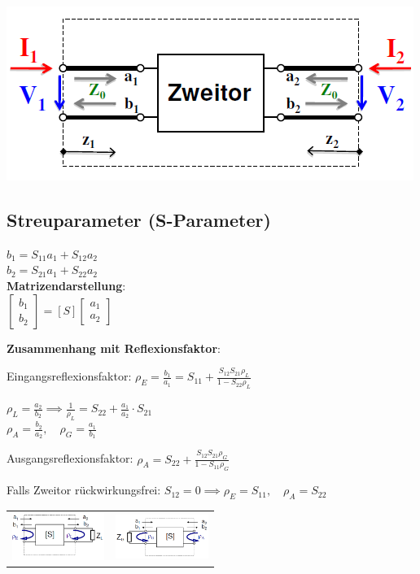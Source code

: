 \documentclass[english]{latex4ei/latex4ei_sheet}
\begin{document}
\begin{sectionbox}
\includegraphics[width = \columnwidth]{./img/zweitor_amplituden.png}
\end{sectionbox}
\begin{sectionbox}
	\subsection{Streuparameter (S-Parameter)}
	$b_1 = S_{11} a_1 + S_{12} a_2$\\
	$b_2 = S_{21} a_1 + S_{22} a_2$\\
	\textbf{Matrizendarstellung}:\\
	$\begin{bmatrix}
		b_1 \\
		b_2
	\end{bmatrix}
	= [S] \begin{bmatrix}
		a_1\\
		a_2
	\end{bmatrix}$

	\textbf{Zusammenhang mit Reflexionsfaktor}:\\
	\begin{emphbox}
	Eingangsreflexionsfaktor: $\rho_E = \frac{b_1}{a_1} = S_{11} + \frac{S_{12}S_{21}\rho_L}{1-S_{22}\rho_L}$
	\end{emphbox}

	$\rho_L = \frac{a_2}{b_2}  \implies \frac{1}{\rho_L} = S_{22} + \frac{a_1}{a_2}\cdot S_{21}$\\
	
	$\rho_A = \frac{b_2}{a_2}, \quad \rho_G = \frac{a_1}{b_1}$\\
	\begin{emphbox}
		Ausgangsreflexionsfaktor: $\rho_A = S_{22} + \frac{S_{12}S_{21}\rho_G}{1-S_{11}\rho_G}$
	\end{emphbox}
Falls Zweitor rückwirkungsfrei: $S_{12} = 0 \implies \rho_E = S_{11}, \quad \rho_A = S_{22}$\\

\begin{tabular*}{\columnwidth}{cc}
\includegraphics[width = 3cm]{./img/eingangsrefl.png} & \includegraphics[width = 3cm]{./img/ausgangsrefl.png}
\end{tabular*}
\end{sectionbox}
\end{document}
